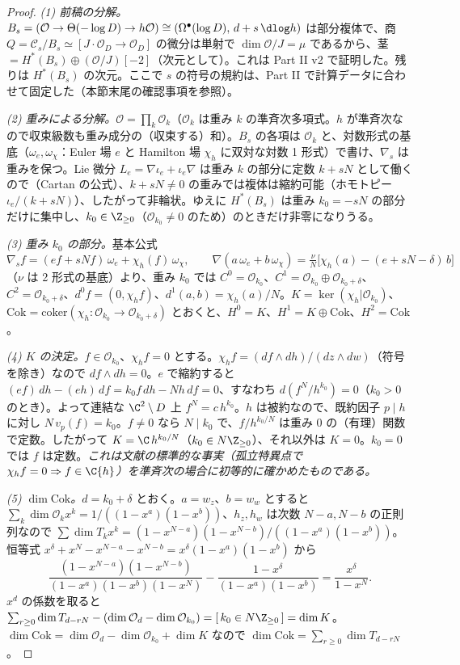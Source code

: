 \begin{proof}
\emph{(1) 前稿の分解。}$B_s=(\mathcal O\to\Theta(-\log D)\to h\mathcal O)\cong(\Omega^\bullet(\log D),\,d+s\,\dlog h)$ は部分複体で、商 $Q=\mathcal C_s/B_s\simeq[J\!\cdot\!\mathcal O_D\to\mathcal O_D]$ の微分は単射で $\dim\mathcal O/J=\mu$ であるから、茎 $=H^*(B_s)\oplus(\mathcal O/J)[-2]$（次元として）。これは Part II v2 で証明した\tP。残りは $H^*(B_s)$ の次元。ここで $s$ の符号の規約は、Part II で計算データに合わせて固定した（本節末尾の確認事項を参照）。

\emph{(2) 重みによる分解。}$\mathcal O=\prod_k\mathcal O_k$（$\mathcal O_k$ は重み $k$ の準斉次多項式。$h$ が準斉次なので収束級数も重み成分の（収束する）和）。$B_s$ の各項は $\mathcal O_k$ と、対数形式の基底（$\omega_e,\omega_\chi$：Euler 場 $e$ と Hamilton 場 $\chi_h$ に双対な対数 1 形式）で書け、$\nabla_s$ は重みを保つ。Lie 微分 $L_e=\nabla\iota_e+\iota_e\nabla$ は重み $k$ の部分に定数 $k+sN$ として働くので（Cartan の公式）、$k+sN\ne0$ の重みでは複体は縮約可能（ホモトピー $\iota_e/(k+sN)$）、したがって非輪状。ゆえに $H^*(B_s)$ は重み $k_0=-sN$ の部分だけに集中し、$k_0\in\Z_{\ge0}$（$\mathcal O_{k_0}\ne0$ のため）のときだけ非零になりうる。

\emph{(3) 重み $k_0$ の部分。}基本公式
\[\nabla_sf=(ef+sNf)\,\omega_e+\chi_h(f)\,\omega_\chi,\qquad\nabla(a\,\omega_e+b\,\omega_\chi)=\tfrac{\nu}{N}\bigl[\chi_h(a)-(e+sN-\delta)\,b\bigr]\]
（$\nu$ は 2 形式の基底）より、重み $k_0$ では $C^0=\mathcal O_{k_0}$、$C^1=\mathcal O_{k_0}\oplus\mathcal O_{k_0+\delta}$、$C^2=\mathcal O_{k_0+\delta}$、$d^0f=(0,\chi_hf)$、$d^1(a,b)=\chi_h(a)/N$。$K=\ker(\chi_h|\mathcal O_{k_0})$、$\mathrm{Cok}=\mathrm{coker}(\chi_h:\mathcal O_{k_0}\to\mathcal O_{k_0+\delta})$ とおくと、$H^0=K$、$H^1=K\oplus\mathrm{Cok}$、$H^2=\mathrm{Cok}$。

\emph{(4) $K$ の決定。}$f\in\mathcal O_{k_0}$、$\chi_hf=0$ とする。$\chi_hf=(df\wedge dh)/(dz\wedge dw)$（符号を除き）なので $df\wedge dh=0$。$e$ で縮約すると $(ef)\,dh-(eh)\,df=k_0f\,dh-Nh\,df=0$、すなわち $d(f^N/h^{k_0})=0$（$k_0>0$ のとき）。よって連結な $\C^2\setminus D$ 上 $f^N=c\,h^{k_0}$。$h$ は被約なので、既約因子 $p\mid h$ に対し $N\,v_p(f)=k_0$。$f\ne0$ なら $N\mid k_0$ で、$f/h^{k_0/N}$ は重み $0$ の（有理）関数で定数。したがって $K=\C\,h^{k_0/N}$（$k_0\in N\Z_{\ge0}$）、それ以外は $K=0$。$k_0=0$ では $f$ は定数。\emph{これは文献の標準的な事実（孤立特異点で $\chi_hf=0\Rightarrow f\in\C\{h\}$）を準斉次の場合に初等的に確かめたものである。}

\emph{(5) $\dim\mathrm{Cok}$。}$d=k_0+\delta$ とおく。$a=w_z$、$b=w_w$ とすると $\sum_k\dim\mathcal O_kx^k=1/((1-x^a)(1-x^b))$、$h_z,h_w$ は次数 $N-a,N-b$ の正則列なので $\sum\dim T_kx^k=(1-x^{N-a})(1-x^{N-b})/((1-x^a)(1-x^b))$。恒等式 $x^\delta+x^N-x^{N-a}-x^{N-b}=x^\delta(1-x^a)(1-x^b)$ から
\[\frac{(1-x^{N-a})(1-x^{N-b})}{(1-x^a)(1-x^b)(1-x^N)}-\frac{1-x^\delta}{(1-x^a)(1-x^b)}=\frac{x^\delta}{1-x^N}.\]
$x^d$ の係数を取ると $\sum_{r\ge0}\dim T_{d-rN}-(\dim\mathcal O_d-\dim\mathcal O_{k_0})=[\,k_0\in N\Z_{\ge0}\,]=\dim K$。$\dim\mathrm{Cok}=\dim\mathcal O_d-\dim\mathcal O_{k_0}+\dim K$ なので $\dim\mathrm{Cok}=\sum_{r\ge0}\dim T_{d-rN}$。


\end{proof}
